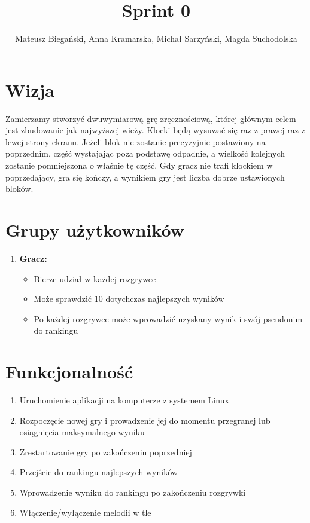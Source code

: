 \documentclass{article}
\begin{document}
\title{Sprint 0}

\author{Mateusz Biegański, Anna Kramarska, Michał Sarzyński, Magda Suchodolska}
\maketitle

\section{Wizja}

Zamierzamy stworzyć dwuwymiarową grę zręcznościową, której głównym celem jest zbudowanie jak najwyższej wieży.
Klocki będą wysuwać się raz z prawej raz z lewej strony ekranu.
Jeżeli blok nie zostanie precyzyjnie postawiony na poprzednim, część wystajając poza podstawę odpadnie, a wielkość kolejnych zostanie pomniejszona o właśnie tę część.
Gdy gracz nie trafi klockiem w poprzedający, gra się kończy, a wynikiem gry jest liczba dobrze ustawionych bloków.

\section{Grupy użytkowników}
\begin{enumerate}
\item\textbf{Gracz:}
  \begin{itemize}
  \item Bierze udział w każdej rozgrywce
  \item Może sprawdzić 10 dotychczas najlepszych wyników
  \item Po każdej rozgrywce może wprowadzić uzyskany wynik i swój pseudonim do rankingu
  \end{itemize}
\end{enumerate}

\section{Funkcjonalność}
\begin{enumerate}
\item Uruchomienie aplikacji na komputerze z systemem Linux
\item Rozpoczęcie nowej gry i prowadzenie jej do momentu przegranej lub osiągnięcia maksymalnego wyniku
\item Zrestartowanie gry po zakończeniu poprzedniej
\item Przejście do rankingu najlepszych wyników
\item Wprowadzenie wyniku do rankingu po zakończeniu rozgrywki
\item Włączenie/wyłączenie melodii w tle
\end{enumerate}
\end{document}

